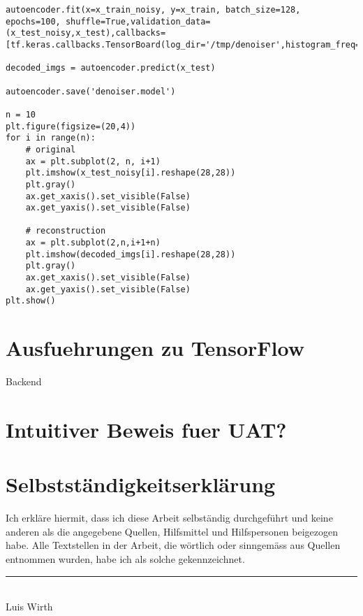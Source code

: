 \begin{appendices}
\begin{verbatim}
autoencoder.fit(x=x_train_noisy, y=x_train, batch_size=128, epochs=100, shuffle=True,validation_data=(x_test_noisy,x_test),callbacks=[tf.keras.callbacks.TensorBoard(log_dir='/tmp/denoiser',histogram_freq=0,write_graph=False)])

decoded_imgs = autoencoder.predict(x_test)

autoencoder.save('denoiser.model')

n = 10
plt.figure(figsize=(20,4))
for i in range(n):
    # original
    ax = plt.subplot(2, n, i+1)
    plt.imshow(x_test_noisy[i].reshape(28,28))
    plt.gray()
    ax.get_xaxis().set_visible(False)
    ax.get_yaxis().set_visible(False)

    # reconstruction
    ax = plt.subplot(2,n,i+1+n)
    plt.imshow(decoded_imgs[i].reshape(28,28))
    plt.gray()
    ax.get_xaxis().set_visible(False)
    ax.get_yaxis().set_visible(False)
plt.show()
\end{verbatim}

\chapter{Ausfuehrungen zu TensorFlow}
Backend

\chapter{Intuitiver Beweis fuer UAT?}

\end{appendices}

\printbibliography[heading=bibintoc]
\pagebreak

\listoffigures
\pagebreak

\listoftables
\pagebreak

\chapter*{Selbstständigkeitserklärung}
Ich erkläre hiermit, dass ich diese Arbeit selbständig durchgeführt und keine anderen als die angegebene Quellen, Hilfsmittel und Hilfspersonen beigezogen habe. Alle Textstellen in der Arbeit, die wörtlich oder sinngemäss aus Quellen entnommen wurden, habe ich als solche gekennzeichnet.

\vspace{2cm}
\begin{center}
  \noindent\rule{5cm}{0.4pt}\\
  Luis Wirth
\end{center}


